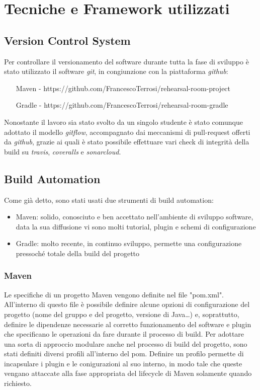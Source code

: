 \chapter{Tecniche e Framework utilizzati}

\section{Version Control System}

Per controllare il versionamento del software durante tutta la fase di sviluppo è stato utilizzato il software \textsl{git}, in congiunzione con la piattaforma \textsl{github}:
\begin{itemize}
	\item[Maven -] https://github.com/FrancescoTerrosi/rehearsal-room-project
	\item[Gradle -] https://github.com/FrancescoTerrosi/rehearsal-room-gradle
\end{itemize}

Nonostante il lavoro sia stato svolto da un singolo studente è stato comunque adottato il modello \textsl{gitflow}, accompagnato dai meccanismi di pull-request offerti da \textsl{github}, grazie ai quali è stato possibile effettuare vari check di integrità della build su \textsl{travis}, \textsl{coveralls} e \textsl{sonarcloud}.

\section{Build Automation}

Come già detto, sono stati usati due strumenti di build automation:
\begin{itemize}
	\item Maven: solido, conosciuto e ben accettato nell'ambiente di sviluppo software, data la sua diffusione vi sono molti tutorial, plugin e schemi di configurazione
	\item Gradle: molto recente, in continuo sviluppo, permette una configurazione pressoché totale della build del progetto
\end{itemize}

\subsection{Maven}

Le specifiche di un progetto Maven vengono definite nel file "pom.xml".\newline
All'interno di questo file è possibile definire alcune opzioni di configurazione del progetto (nome del gruppo e del progetto, versione di Java\dots) e, soprattutto, definire le dipendenze necessarie al corretto funzionamento del software e plugin che specificano le operazioni da fare durante il processo di build.\newline
Per adottare una sorta di approccio modulare anche nel processo di build del progetto, sono stati definiti diversi profili all'interno del pom.\newline
Definire un profilo permette di incapsulare i plugin e le conigurazioni al suo interno, in modo tale che queste vengano attaccate alla fase appropriata del lifecycle di Maven solamente quando richiesto.


